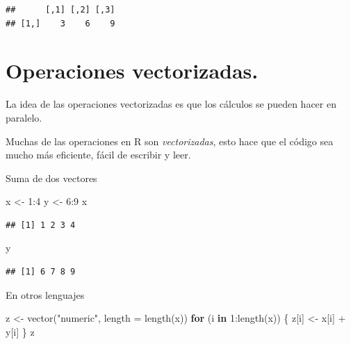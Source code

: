 \documentclass[
  12pt,
]{book}
\newenvironment{Shaded}{\begin{snugshade}}{\end{snugshade}}
\newcommand{\AttributeTok}[1]{\textcolor[rgb]{0.77,0.63,0.00}{#1}}
\newcommand{\ControlFlowTok}[1]{\textcolor[rgb]{0.13,0.29,0.53}{\textbf{#1}}}
\newcommand{\DecValTok}[1]{\textcolor[rgb]{0.00,0.00,0.81}{#1}}
\newcommand{\FunctionTok}[1]{\textcolor[rgb]{0.00,0.00,0.00}{#1}}
\newcommand{\NormalTok}[1]{#1}
\newcommand{\OtherTok}[1]{\textcolor[rgb]{0.56,0.35,0.01}{#1}}
\newcommand{\SpecialCharTok}[1]{\textcolor[rgb]{0.00,0.00,0.00}{#1}}
\newcommand{\StringTok}[1]{\textcolor[rgb]{0.31,0.60,0.02}{#1}}
\begin{document}
\begin{verbatim}
##      [,1] [,2] [,3]
## [1,]    3    6    9
\end{verbatim}

\hypertarget{operaciones-vectorizadas.}{%
\chapter{\texorpdfstring{\textbf{Operaciones vectorizadas.}}{Operaciones vectorizadas.}}\label{operaciones-vectorizadas.}}

La idea de las operaciones vectorizadas es que los cálculos se pueden hacer en paralelo.

Muchas de las operaciones en R son \emph{vectorizadas}, esto hace que el código sea mucho más eficiente, fácil de escribir y leer.

Suma de dos vectores

\begin{Shaded}
\begin{Highlighting}[]
\NormalTok{x }\OtherTok{\textless{}{-}} \DecValTok{1}\SpecialCharTok{:}\DecValTok{4}
\NormalTok{y }\OtherTok{\textless{}{-}} \DecValTok{6}\SpecialCharTok{:}\DecValTok{9}
\NormalTok{x}
\end{Highlighting}
\end{Shaded}

\begin{verbatim}
## [1] 1 2 3 4
\end{verbatim}

\begin{Shaded}
\begin{Highlighting}[]
\NormalTok{y}
\end{Highlighting}
\end{Shaded}

\begin{verbatim}
## [1] 6 7 8 9
\end{verbatim}

En otros lenguajes

\begin{Shaded}
\begin{Highlighting}[]
\NormalTok{z }\OtherTok{\textless{}{-}} \FunctionTok{vector}\NormalTok{(}\StringTok{"numeric"}\NormalTok{, }\AttributeTok{length =} \FunctionTok{length}\NormalTok{(x))}
\ControlFlowTok{for}\NormalTok{ (i }\ControlFlowTok{in} \DecValTok{1}\SpecialCharTok{:}\FunctionTok{length}\NormalTok{(x)) \{}
\NormalTok{  z[i] }\OtherTok{\textless{}{-}}\NormalTok{ x[i] }\SpecialCharTok{+}\NormalTok{ y[i]}
\NormalTok{\}}
\NormalTok{z}
\end{Highlighting}
\end{Shaded}
\end{document}
